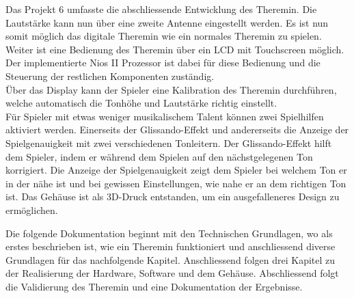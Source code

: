 Das Projekt 6 umfasste die abschliessende Entwicklung des Theremin. Die Lautstärke kann nun über eine zweite Antenne eingestellt werden. Es ist nun somit möglich das digitale Theremin wie ein normales Theremin zu spielen.\\
Weiter ist eine Bedienung des Theremin über ein LCD mit Touchscreen möglich. Der implementierte Nios II Prozessor ist dabei für diese Bedienung und die Steuerung der restlichen Komponenten zuständig.\\
Über das Display kann der Spieler eine Kalibration des Theremin durchführen, welche automatisch die Tonhöhe und Lautstärke richtig einstellt.\\
Für Spieler mit etwas weniger musikalischem Talent können zwei Spielhilfen aktiviert werden. Einerseits der Glissando-Effekt und andererseits die Anzeige der Spielgenauigkeit mit zwei verschiedenen Tonleitern. Der Glissando-Effekt hilft dem Spieler, indem er während dem Spielen auf den nächstgelegenen Ton korrigiert. Die Anzeige der Spielgenauigkeit zeigt dem Spieler bei welchem Ton er in der nähe ist und bei gewissen Einstellungen, wie nahe er an dem richtigen Ton ist.
Das Gehäuse ist als 3D-Druck entstanden, um ein ausgefalleneres Design zu ermöglichen.


Die folgende Dokumentation beginnt mit den Technischen Grundlagen, wo als erstes beschrieben ist, wie ein Theremin funktioniert und anschliessend diverse Grundlagen für das nachfolgende Kapitel. Anschliessend folgen drei Kapitel zu der Realisierung der Hardware, Software und dem Gehäuse. Abschliessend folgt die Validierung des Theremin und eine Dokumentation der Ergebnisse.





